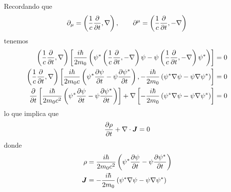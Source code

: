 Recordando que
\begin{equation}
  \partial_\mu =\left(\frac{1}{c}\pdv{t},\nabla\right),\qquad \partial^\mu =\left(\frac{1}{c}\pdv{t},-\nabla\right)
\end{equation}
tenemos
\begin{align}
  \left(\frac{1}{c}\pdv{t},\nabla\right)\left[\frac{i\hbar}{2m_0}\left(\psi^*\left(\frac{1}{c}\pdv{t},-\nabla\right) \psi-\psi\left(\frac{1}{c}\pdv{t},-\nabla\right) \psi^*\right)\right]&=0\\
  \left(\frac{1}{c}\pdv{t},\nabla\right)\left[\frac{i\hbar}{2m_0c}\left(\psi^*\pdv{\psi}{t}-\psi\pdv{\psi^*}{t}\right),-\frac{i\hbar}{2m_0}\left(\psi^*\nabla\psi-\psi\nabla\psi^*\right)\right]&=0\\
  \pdv{t}\left[\frac{i\hbar}{2m_0c^2}\left(\psi^*\pdv{\psi}{t}-\psi\pdv{\psi^*}{t}\right)\right]+\nabla\left[-\frac{i\hbar}{2m_0}\left(\psi^*\nabla\psi-\psi\nabla\psi^*\right)\right]&=0
\end{align}
lo que implica que
\begin{equation}
  \pdv{\rho }{t}+\nabla\cdot\vb*{J}=0
\end{equation}
donde
\begin{align}
  \rho&=\frac{i\hbar}{2m_0c^2}\left(\psi^*\pdv{\psi}{t}-\psi\pdv{\psi^*}{t}\right)\\
  \vb*{J}&=-\frac{i\hbar}{2m_0}\left(\psi^*\nabla\psi-\psi\nabla\psi^*\right)
\end{align}







































































